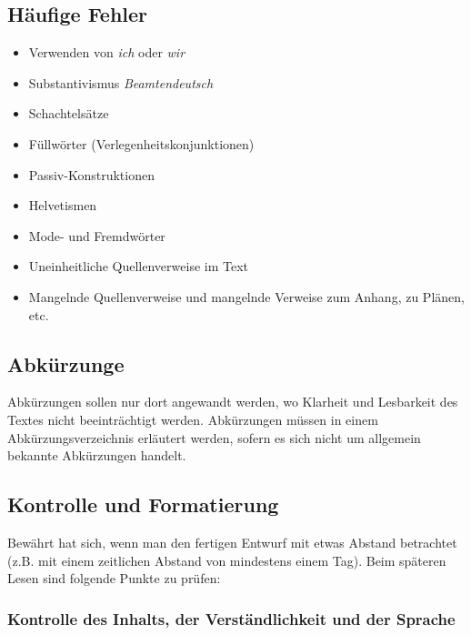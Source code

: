 \documentclass[
]{agujournal2019}
\providecommand{\tightlist}{%
  \setlength{\itemsep}{0pt}\setlength{\parskip}{0pt}}\usepackage{longtable,booktabs,array}
\begin{document}
\subsection{Häufige Fehler}\label{huxe4ufige-fehler}

\begin{itemize}
\tightlist
\item
  Verwenden von \emph{ich} oder \emph{wir}
\item
  Substantivismus \emph{Beamtendeutsch}
\item
  Schachtelsätze
\item
  Füllwörter (Verlegenheitskonjunktionen)
\item
  Passiv-Konstruktionen
\item
  Helvetismen
\item
  Mode- und Fremdwörter
\item
  Uneinheitliche Quellenverweise im Text
\item
  Mangelnde Quellenverweise und mangelnde Verweise zum Anhang, zu
  Plänen, etc.
\end{itemize}

\subsection{Abkürzunge}\label{abkuxfcrzunge}

Abkürzungen sollen nur dort angewandt werden, wo Klarheit und Lesbarkeit
des Textes nicht beeinträchtigt werden. Abkürzungen müssen in einem
Abkürzungsverzeichnis erläutert werden, sofern es sich nicht um
allgemein bekannte Abkürzungen handelt.

\subsection{Kontrolle und
Formatierung}\label{kontrolle-und-formatierung}

Bewährt hat sich, wenn man den fertigen Entwurf mit etwas Abstand
betrachtet (z.B. mit einem zeitlichen Abstand von mindestens einem Tag).
Beim späteren Lesen sind folgende Punkte zu prüfen:

\subsubsection{Kontrolle des Inhalts, der Verständlichkeit und der
Sprache}\label{kontrolle-des-inhalts-der-verstuxe4ndlichkeit-und-der-sprache}
\end{document}
